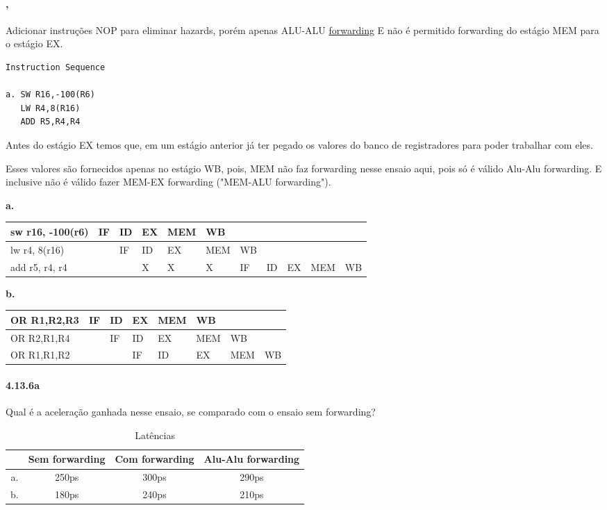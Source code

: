 \documentclass{article}
\begin{document}
\paragraph{, } Adicionar instruções NOP para eliminar hazards, 
porém apenas ALU-ALU \underline{forwarding} E não é permitido forwarding do estágio MEM 
para o estágio EX.

\begin{verbatim}
Instruction Sequence

a. SW R16,-100(R6)
   LW R4,8(R16)
   ADD R5,R4,R4
\end{verbatim}

Antes do estágio EX temos que, em um estágio anterior já ter pegado os valores do banco de 
registradores para poder trabalhar com eles.

Esses valores são fornecidos apenas no estágio WB, pois, MEM não faz forwarding nesse ensaio 
aqui, pois só é válido Alu-Alu forwarding. E inclusive não é válido fazer MEM-EX forwarding 
("MEM-ALU forwarding").

\textbf{a.}

\begin{tabular}{|l|l|l|l|l|l|l|l|l|l|l|}
\hline sw r16, -100(r6) & IF& ID& EX& MEM&  WB&   &   &   &    &   \\
\hline lw r4, 8(r16)    &   & IF& ID&  EX& MEM& WB&   &   &    &   \\
\hline add r5, r4, r4   &   &   &  X&   X&   X& IF& ID& EX& MEM& WB\\
\hline
\end{tabular}

\textbf{b.}

\begin{tabular}{|l|l|l|l|l|l|l|l|}
  \hline OR R1,R2,R3 & IF& ID& EX& MEM&  WB&    &   \\
  \hline OR R2,R1,R4 &   & IF& ID&  EX& MEM&  WB&   \\
  \hline OR R1,R1,R2 &   &   & IF&  ID&  EX& MEM& WB\\
  \hline
\end{tabular}

\paragraph{4.13.6a} Qual é a aceleração ganhada nesse ensaio, se comparado com o ensaio sem 
forwarding?

\begin{table}[ht!]
\centering
\begin{tabular}{|c|c|c|c|}
\hline  & Sem forwarding & Com forwarding & Alu-Alu forwarding \\
\hline a. & 250ps & 300ps & 290ps \\
\hline b. & 180ps & 240ps & 210ps \\
\hline
\end{tabular}
\caption{Latências}
\end{table}
\end{document}
